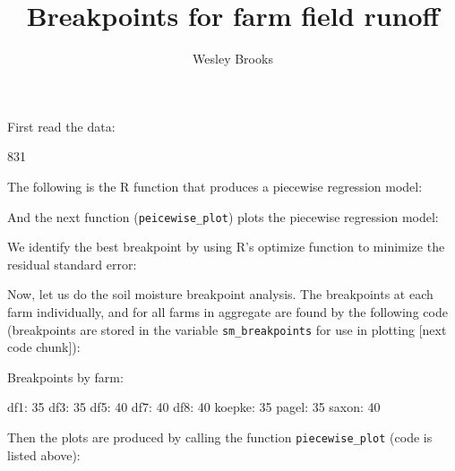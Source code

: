 \documentclass[12pt]{article}
\title{Breakpoints for farm field runoff}
\author{Wesley Brooks}
\date{}                                           %
\begin{document}
\maketitle

First read the data:
\vspace{3mm}

\begin{Schunk}
\begin{Soutput}
[1] 831
\end{Soutput}
\end{Schunk}

\vspace{5mm}

The following is the R function that produces a piecewise regression model:


\newpage

And the next function (\verb+peicewise_plot+) plots the piecewise regression model:


\newpage
We identify the best breakpoint by using R's optimize function to minimize the residual standard error:

\begin{Schunk}
\end{Schunk}



\vspace{5mm}
Now, let us do the soil moisture breakpoint analysis. The breakpoints at each farm individually, and for all farms in aggregate are found by the following code (breakpoints are stored in the variable \verb+sm_breakpoints+ for use in plotting [next code chunk]):\\


\begin{Schunk}
\begin{Soutput}
Breakpoints by farm:
\end{Soutput}
\begin{Soutput}
df1: 35
df3: 35
df5: 40
df7: 40
df8: 40
koepke: 35
pagel: 35
saxon: 40
\end{Soutput}
\end{Schunk}

\newpage
Then the plots are produced by calling the function \verb+piecewise_plot+ (code is listed above):\\
\end{document}
